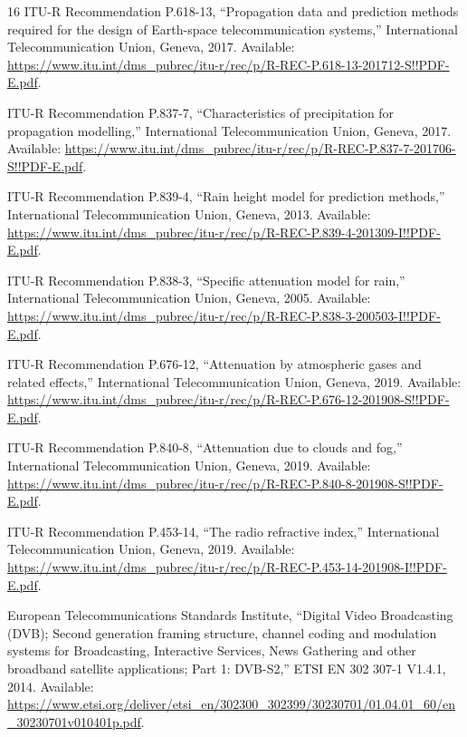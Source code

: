 \begin{thebibliography}{16}
ITU-R Recommendation P.618-13, ``Propagation data and prediction methods required for the design of Earth-space telecommunication systems,'' International Telecommunication Union, Geneva, 2017. Available: \url{https://www.itu.int/dms_pubrec/itu-r/rec/p/R-REC-P.618-13-201712-S!!PDF-E.pdf}.

ITU-R Recommendation P.837-7, ``Characteristics of precipitation for propagation modelling,'' International Telecommunication Union, Geneva, 2017. Available: \url{https://www.itu.int/dms_pubrec/itu-r/rec/p/R-REC-P.837-7-201706-S!!PDF-E.pdf}.

ITU-R Recommendation P.839-4, ``Rain height model for prediction methods,'' International Telecommunication Union, Geneva, 2013. Available: \url{https://www.itu.int/dms_pubrec/itu-r/rec/p/R-REC-P.839-4-201309-I!!PDF-E.pdf}.

ITU-R Recommendation P.838-3, ``Specific attenuation model for rain,'' International Telecommunication Union, Geneva, 2005. Available: \url{https://www.itu.int/dms_pubrec/itu-r/rec/p/R-REC-P.838-3-200503-I!!PDF-E.pdf}.

ITU-R Recommendation P.676-12, ``Attenuation by atmospheric gases and related effects,'' International Telecommunication Union, Geneva, 2019. Available: \url{https://www.itu.int/dms_pubrec/itu-r/rec/p/R-REC-P.676-12-201908-S!!PDF-E.pdf}.

ITU-R Recommendation P.840-8, ``Attenuation due to clouds and fog,'' International Telecommunication Union, Geneva, 2019. Available: \url{https://www.itu.int/dms_pubrec/itu-r/rec/p/R-REC-P.840-8-201908-S!!PDF-E.pdf}.

ITU-R Recommendation P.453-14, ``The radio refractive index,'' International Telecommunication Union, Geneva, 2019. Available: \url{https://www.itu.int/dms_pubrec/itu-r/rec/p/R-REC-P.453-14-201908-I!!PDF-E.pdf}.

European Telecommunications Standards Institute, ``Digital Video Broadcasting (DVB); Second generation framing structure, channel coding and modulation systems for Broadcasting, Interactive Services, News Gathering and other broadband satellite applications; Part 1: DVB-S2,'' ETSI EN 302 307-1 V1.4.1, 2014. Available: \url{https://www.etsi.org/deliver/etsi_en/302300_302399/30230701/01.04.01_60/en_30230701v010401p.pdf}.

\end{thebibliography}
